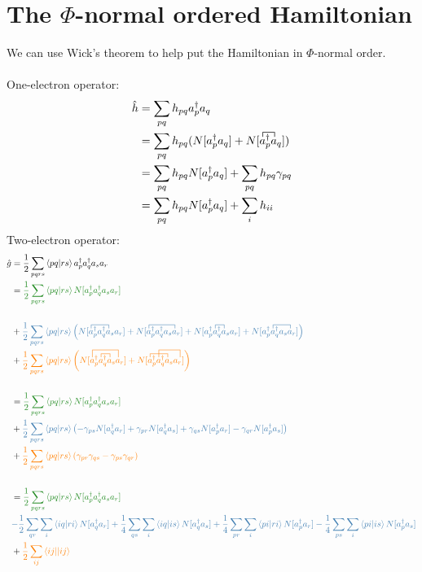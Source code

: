 \documentclass{article}
\newcommand{\fctr}{\contraction}
\newcommand{\dg}{\ensuremath{^\dagger} }
\def\cb#1{{\color{blue}#1}}
\def\co#1{{\color{orange}#1}}
\def\cg#1{{\color{green}#1}}
\begin{document}
\section{The $\Phi$-normal ordered Hamiltonian}
We can use Wick's theorem to help put the Hamiltonian in $\Phi$-normal order.
\\ \\
One-electron operator:
\begin{align*}
\hat{h} &= \sum_{pq} h_{pq} a_p\dg a_q \\
 &= \sum_{pq}h_{pq} (N[a_p\dg a_q] + N[\fctr{}{a}{{}_p\dg}{a} a_p\dg a_q]) \\
&= \sum_{pq}h_{pq} N[a_p\dg a_q] + \sum_{pq}h_{pq} \gamma_{pq} \\
&= \sum_{pq}h_{pq} N[a_p\dg a_q] + \sum_{i}h_{ii} \\
\end{align*}
Two-electron operator:
\begin{align*}
\hat{g} &=  \frac{1}{2} \sum_{pqrs} \braket{pq | rs} a_p\dg a_q\dg a_s a_r \\
&= \cg{\frac{1}{2} \sum_{pqrs} \braket{pq | rs} N[a_p\dg a_q\dg a_s a_r] } \\ \\
&+ \cb{\frac{1}{2} \sum_{pqrs} \braket{pq | rs} \left(N[\fctr{}{a}{{}_p\dg a_q\dg}{a}  a_p\dg a_q\dg a_s a_r] + 
N[\fctr{}{a}{{}_p\dg a_q\dg a_s}{a}  a_p\dg a_q\dg a_s a_r] + 
N[\fctr{a_p\dg}{a}{{}_q\dg }{a}  a_p\dg a_q\dg a_s a_r] + 
N[\fctr{a_p\dg}{a}{{}_q\dg a_s }{a}  a_p\dg a_q\dg a_s a_r] \right)} \\
&+ \co{ \frac{1}{2} \sum_{pqrs} \braket{pq | rs} \left( 
N[\fctr[2ex]{}{a}{{}_p\dg a_q\dg a_s }{a} \fctr{a_p\dg}{a}{{}_q\dg}{a}  a_p\dg a_q\dg a_s a_r] +
N[\fctr{}{a}{{}_p\dg a_q\dg }{a}  \fctr[2ex]{a_p\dg}{a}{{}q\dg a_s}{a} a_p\dg a_q\dg a_s a_r]  
  \right) } \\  \\
&= \cg{\frac{1}{2} \sum_{pqrs} \braket{pq | rs} N[a_p\dg a_q\dg a_s a_r] } \\ 
&+ \cb{\frac{1}{2} \sum_{pqrs} \braket{pq | rs} \left(-\gamma_{ps} N[ a_q\dg a_r] + 
\gamma_{pr} N[ a_q\dg a_s ] + 
\gamma_{qs} N[ a_p\dg a_r] -
\gamma_{qr} N[ a_p\dg a_s] \right)} \\
&+ \co{ \frac{1}{2} \sum_{pqrs} \braket{pq | rs} ( \gamma_{pr}\gamma_{qs} -\gamma_{ps}\gamma_{qr}) }\\ \\
&= \cg{\frac{1}{2} \sum_{pqrs} \braket{pq | rs} N[a_p\dg a_q\dg a_s a_r] } \\
& \cb{- \frac{1}{2} \sum_{qr} \sum_i \braket{iq | ri} N[ a_q\dg a_r] +  
\frac{1}{4} \sum_{qs} \sum_i \braket{iq | is} N[ a_q\dg a_s ] + 
\frac{1}{4} \sum_{pr} \sum_i \braket{pi | ri} N[ a_p\dg a_r] -
\frac{1}{4} \sum_{ps} \sum_i \braket{pi | is} N[ a_p\dg a_s] } \\
&+ \co{ \frac{1}{2} \sum_{ij} \braket{ij || ij} }
\end{align*}
\end{document}
